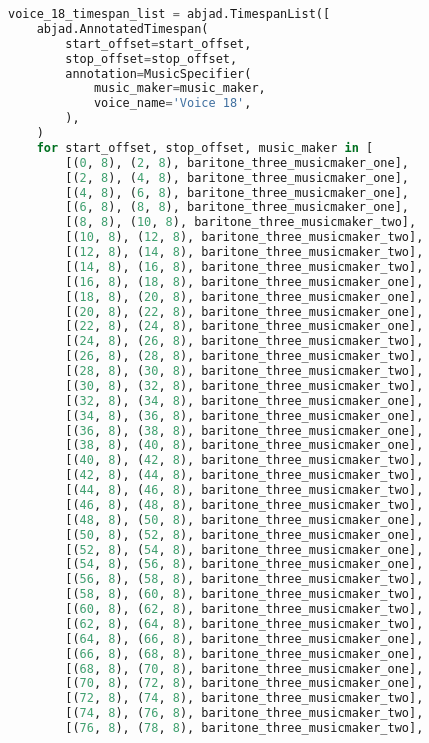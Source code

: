 \begin{lstlisting}[language=Python, caption=Invocation Source Code]
voice_18_timespan_list = abjad.TimespanList([
    abjad.AnnotatedTimespan(
        start_offset=start_offset,
        stop_offset=stop_offset,
        annotation=MusicSpecifier(
            music_maker=music_maker,
            voice_name='Voice 18',
        ),
    )
    for start_offset, stop_offset, music_maker in [
        [(0, 8), (2, 8), baritone_three_musicmaker_one],
        [(2, 8), (4, 8), baritone_three_musicmaker_one],
        [(4, 8), (6, 8), baritone_three_musicmaker_one],
        [(6, 8), (8, 8), baritone_three_musicmaker_one],
        [(8, 8), (10, 8), baritone_three_musicmaker_two],
        [(10, 8), (12, 8), baritone_three_musicmaker_two],
        [(12, 8), (14, 8), baritone_three_musicmaker_two],
        [(14, 8), (16, 8), baritone_three_musicmaker_two],
        [(16, 8), (18, 8), baritone_three_musicmaker_one],
        [(18, 8), (20, 8), baritone_three_musicmaker_one],
        [(20, 8), (22, 8), baritone_three_musicmaker_one],
        [(22, 8), (24, 8), baritone_three_musicmaker_one],
        [(24, 8), (26, 8), baritone_three_musicmaker_two],
        [(26, 8), (28, 8), baritone_three_musicmaker_two],
        [(28, 8), (30, 8), baritone_three_musicmaker_two],
        [(30, 8), (32, 8), baritone_three_musicmaker_two],
        [(32, 8), (34, 8), baritone_three_musicmaker_one],
        [(34, 8), (36, 8), baritone_three_musicmaker_one],
        [(36, 8), (38, 8), baritone_three_musicmaker_one],
        [(38, 8), (40, 8), baritone_three_musicmaker_one],
        [(40, 8), (42, 8), baritone_three_musicmaker_two],
        [(42, 8), (44, 8), baritone_three_musicmaker_two],
        [(44, 8), (46, 8), baritone_three_musicmaker_two],
        [(46, 8), (48, 8), baritone_three_musicmaker_two],
        [(48, 8), (50, 8), baritone_three_musicmaker_one],
        [(50, 8), (52, 8), baritone_three_musicmaker_one],
        [(52, 8), (54, 8), baritone_three_musicmaker_one],
        [(54, 8), (56, 8), baritone_three_musicmaker_one],
        [(56, 8), (58, 8), baritone_three_musicmaker_two],
        [(58, 8), (60, 8), baritone_three_musicmaker_two],
        [(60, 8), (62, 8), baritone_three_musicmaker_two],
        [(62, 8), (64, 8), baritone_three_musicmaker_two],
        [(64, 8), (66, 8), baritone_three_musicmaker_one],
        [(66, 8), (68, 8), baritone_three_musicmaker_one],
        [(68, 8), (70, 8), baritone_three_musicmaker_one],
        [(70, 8), (72, 8), baritone_three_musicmaker_one],
        [(72, 8), (74, 8), baritone_three_musicmaker_two],
        [(74, 8), (76, 8), baritone_three_musicmaker_two],
        [(76, 8), (78, 8), baritone_three_musicmaker_two],

\end{lstlisting}

